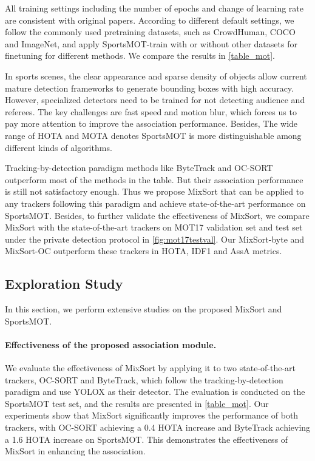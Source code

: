 \documentclass[10pt,twocolumn,letterpaper]{article}
\begin{document}
{All training settings including the number of epochs and change of learning rate are consistent with original papers. According to different default settings, we follow the commonly used pretraining datasets, such as CrowdHuman\cite{shao2018crowdhuman}, COCO\cite{lin2014microsoft} and ImageNet\cite{deng2009imagenet}, and apply SportsMOT-train with or without other datasets for finetuning for different methods. We compare the results in \cref{table_mot}.

In sports scenes, the clear appearance and sparse density of objects allow current mature detection frameworks to generate bounding boxes with high accuracy. However, specialized detectors need to be trained for not detecting audience and referees. The key challenges are fast speed and motion blur, which forces us to pay more attention to improve the association performance. Besides, The wide range of HOTA and MOTA denotes SportsMOT is more distinguishable among different kinds of algorithms. 

Tracking-by-detection paradigm methods like ByteTrack and OC-SORT outperform most of the methods in the table. But their association performance is still not satisfactory enough. Thus we propose MixSort that can be applied to any trackers following this paradigm and achieve state-of-the-art performance on SportsMOT.
Besides, to further validate the effectiveness of MixSort, we compare MixSort with the state-of-the-art trackers on MOT17 validation set and test set under the private detection protocol in \cref{fig:mot17testval}. Our MixSort-byte and MixSort-OC outperform these trackers in HOTA, IDF1 and AssA metrics.


\subsection{Exploration Study}
\label{exploration_sec}
In this section, we perform extensive studies on the proposed MixSort and SportsMOT. 

\vspace{-4mm}
\paragraph{Effectiveness of the proposed association module.}
We evaluate the effectiveness of MixSort by applying it to two state-of-the-art trackers, OC-SORT\cite{cao2022observation} and ByteTrack\cite{zhang2022bytetrack}, which follow the tracking-by-detection paradigm and use YOLOX as their detector. The evaluation is conducted on the SportsMOT test set, and the results are presented in \cref{table_mot}. Our experiments show that MixSort significantly improves the performance of both trackers, with OC-SORT achieving a 0.4 HOTA increase and ByteTrack achieving a 1.6 HOTA increase on SportsMOT. This demonstrates the effectiveness of MixSort in enhancing the association.

}
\end{document}

